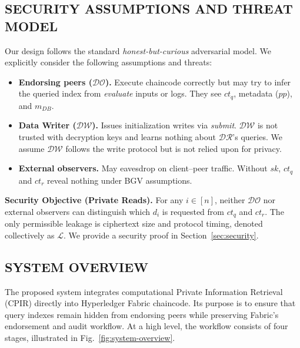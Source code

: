 \documentclass{ieeetj}
\begin{document}
\subsection{SECURITY ASSUMPTIONS AND THREAT MODEL}\label{sec:threat_model}

Our design follows the standard \emph{honest-but-curious} adversarial model. 
We explicitly consider the following assumptions and threats:

\begin{itemize}
    \item \textbf{Endorsing peers ($\mathcal{DO}$).} Execute chaincode correctly but may try to infer the queried index 
    from \emph{evaluate} inputs or logs. They see $ct_q$, metadata ($pp$), and \emph{$m_{DB}$}.
    \item \textbf{Data Writer ($\mathcal{DW}$).} Issues initialization writes via \emph{submit}. $\mathcal{DW}$ is not 
    trusted with decryption keys and learns nothing about $\mathcal{DR}$’s queries. We assume $\mathcal{DW}$ follows the 
    write protocol but is not relied upon for privacy.
    \item \textbf{External observers.} May eavesdrop on client–peer traffic. Without $sk$, $ct_q$ and $ct_r$ reveal
     nothing under BGV assumptions.
\end{itemize}

\noindent \textbf{Security Objective (Private Reads).}
For any $i\in[n]$, neither $\mathcal{DO}$ nor external observers can distinguish which $d_i$ is requested from $ct_q$ and $ct_r$.
The only permissible leakage is ciphertext size and protocol timing, denoted collectively as $\mathcal{L}$.
We provide a security proof in Section~\ref{sec:security}.

\subsection{SYSTEM OVERVIEW}

The proposed system integrates computational Private Information Retrieval (CPIR) directly into Hyperledger Fabric chaincode. 
Its purpose is to ensure that query indexes remain hidden from endorsing peers while preserving Fabric’s endorsement and audit workflow. 
At a high level, the workflow consists of four stages, illustrated in Fig.~\ref{fig:system-overview}.
\end{document}
